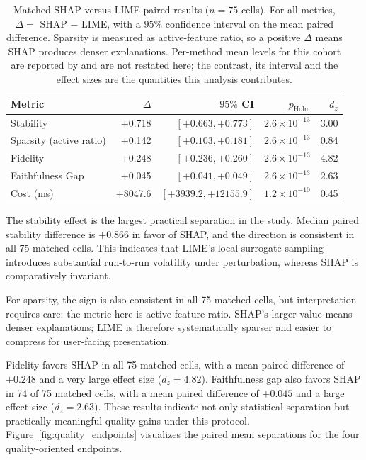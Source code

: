 \documentclass[fleqn,10pt,lineno]{wlpeerj}
\begin{document}
\begin{table}[t]
\centering
\caption{Matched SHAP-versus-LIME paired results ($n=75$ cells). For all
metrics, $\Delta = $ SHAP $-$ LIME, with a $95\%$ confidence interval on the
mean paired difference. Sparsity is measured as active-feature ratio, so a
positive $\Delta$ means SHAP produces denser explanations. Per-method mean
levels for this cohort are reported by \citet{herrera2026framework} and are
not restated here; the contrast, its interval and the effect sizes are the
quantities this analysis contributes.}
\label{tab:paired_main}
\begin{tabular}{lrrrr}
\toprule
Metric & $\Delta$ & $95\%$ CI & $p_{\mathrm{Holm}}$ & $d_z$ \\
\midrule
Stability & +0.718 & $[+0.663, +0.773]$ & $2.6\times10^{-13}$ & 3.00 \\
Sparsity (active ratio) & +0.142 & $[+0.103, +0.181]$ & $2.6\times10^{-13}$ & 0.84 \\
Fidelity & +0.248 & $[+0.236, +0.260]$ & $2.6\times10^{-13}$ & 4.82 \\
Faithfulness Gap & +0.045 & $[+0.041, +0.049]$ & $2.6\times10^{-13}$ & 2.63 \\
Cost (ms) & +8047.6 & $[+3939.2, +12155.9]$ & $1.2\times10^{-10}$ & 0.45 \\
\bottomrule
\end{tabular}
\end{table}

The stability effect is the largest practical separation in the study.
Median paired stability difference is $+0.866$ in favor of SHAP, and the
direction is consistent in all 75 matched cells. This indicates that
LIME's local surrogate sampling introduces substantial run-to-run
volatility under perturbation, whereas SHAP is comparatively invariant.

For sparsity, the sign is also consistent in all 75 matched cells, but
interpretation requires care: the metric here is active-feature ratio.
SHAP's larger value means denser explanations; LIME is therefore
systematically sparser and easier to compress for user-facing presentation.

Fidelity favors SHAP in all 75 matched cells, with a mean paired
difference of $+0.248$ and a very large effect size ($d_z = 4.82$).
Faithfulness gap also favors SHAP in 74 of 75 matched cells, with a mean
paired difference of $+0.045$ and a large effect size ($d_z = 2.63$).
These results indicate not only statistical separation but practically
meaningful quality gains under this protocol.
Figure~\ref{fig:quality_endpoints} visualizes the paired mean separations
for the four quality-oriented endpoints.
\end{document}
